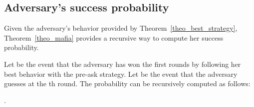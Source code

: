 \documentclass{llncs}
\begin{document}
\subsection{Adversary's success probability}


Given the adversary's behavior provided by Theorem~\ref{theo_best_strategy}, Theorem~\ref{theo_mafia} provides a recursive way to compute her success probability.

\begin{theorem}\label{theo_mafia}
Let  be the event that the adversary has won the first  rounds by 
following her best behavior with the pre-ask strategy. Let  be the event 
that the adversary guesses  at the th 
round. The probability  can be recursively computed as follows:









\noindent {}  
   .
\end{theorem}
\end{document}
